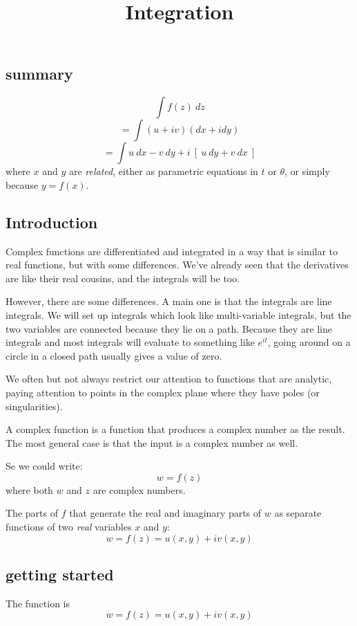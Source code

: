 \documentclass[11pt, oneside]{article}
\title{Integration}
\date{}
\begin{document}
\maketitle
\Large


\subsection*{summary}
\[ \int f(z) \ dz \]
\[ = \int (u + iv)(dx + i dy) \]
\[ = \int u \ dx - v \ dy + i \ [ \ u \ dy + v \ dx \ ] \]
where $x$ and $y$ are \emph{related}, either as parametric equations in $t$ or $\theta$, or simply because $y = f(x)$.

\subsection*{Introduction}

Complex functions are differentiated and integrated in a way that is similar to real functions, but with some differences.  We've already seen that the derivatives are like their real cousins, and the integrals will be too.

However, there are some differences.  A main one is that the integrals are line integrals.  We will set up integrals which look like multi-variable integrals, but the two variables are connected because they lie on a path.  Because they are line integrals and most integrals will evaluate to something like $e^{it}$, going around on a circle in a closed path usually gives a value of zero.

We often but not always restrict our attention to functions that are analytic, paying attention to points in the complex plane where they have poles (or singularities).  

A complex function is a function that produces a complex number as the result. The most general case is that the input is a complex number as well.  

Se we could write:
\[ w = f(z) \]
where both $w$ and $z$ are complex numbers.

The parts of $f$ that generate the real and imaginary parts of $w$ as separate functions of two \emph{real} variables $x$ and $y$:
\[ w = f(z) = u(x,y) + iv(x,y) \]

\subsection*{getting started}
The function is
\[ w = f(z) = u(x,y) + iv(x,y) \]
\end{document}
